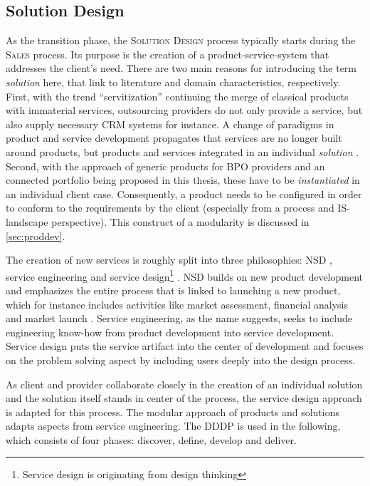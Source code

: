 	\subsection{Solution Design}
	\label{sec:soldef}
	As the transition phase, the \textsc{Solution Design} process typically starts during the \textsc{Sales} process. Its purpose is the creation of a product-service-system that addresses the client's need. There are two main reasons for introducing the term \textit{solution} here, that link to literature and domain characteristics, respectively. First, with the trend \enquote{servitization} \citep{servitization} continuing the merge of classical products with immaterial services, outsourcing providers do not only provide a service, but also supply necessary \acrshort{CRM} systems for instance. A change of paradigms in product and service development propagates that services are no longer built around products, but products and services integrated in an individual \textit{solution} \citep[]{Spath2006}.
	Second, with the approach of generic products for \acrshort{BPO} providers and an connected portfolio being proposed in this thesis, these have to be \textit{instantiated} in an individual client case. Consequently, a product needs to be configured in order to conform to the requirements by the client (especially from a process and  \acrshort{IS}-landscape perspective). This construct of a modularity is discussed in \ref{sec:proddev}. 
	
	The creation of new services is roughly split into three philosophies: \acrfull{NSD} \citep{cowell1988new}, service engineering \citep{9783540253242} and service design\footnote{Service design is originating from design thinking} \citep{rowe1987design}. \acrshort{NSD} builds on new product development and emphasizes the entire process that is linked to launching a new product, which for instance includes activities like market assessment, financial analysis and market launch \citep{cooper1988new}. Service engineering, as the name suggests, seeks to include engineering know-how from product development into service development. Service design puts the service artifact into the center of development and focuses on the problem solving aspect by including users deeply into the design process. 
	
	As client and provider collaborate closely in the creation of an individual solution and the solution itself stands in center of the process, the service design approach is adapted for this process. The modular approach of products and solutions adapts aspects from service engineering. The \acrfull{DDDP} \citep{dcdd} is used in the following, which consists of four phases: discover, define, develop and deliver.
	

